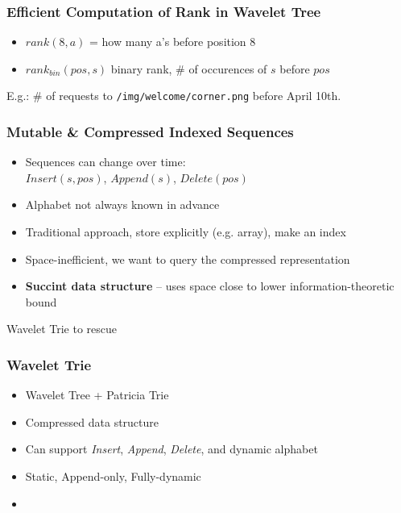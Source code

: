 \documentclass{beamer}
\begin{document}
\begin{frame}
\frametitle{Efficient Computation of Rank in Wavelet Tree}
\begin{itemize}
  \item $rank(8, a)$ = how many a's before position 8
  \item $rank_{bin}(pos, s)$ binary rank, \# of occurences of $s$ before $pos$  
\end{itemize}
\begin{figure}
\end{figure}
{\small E.g.: \# of requests to \texttt{/img/welcome/corner.png} before April 10th.}
\end{frame}


\begin{frame}
\frametitle{Mutable \& Compressed Indexed Sequences}
\begin{itemize}
  \item Sequences can change over time:\\$Insert(s, pos)$, $Append(s)$, $Delete(pos)$
  \item Alphabet not always known in advance 
\end{itemize}
\vspace{10pt}
\begin{itemize}
  \item Traditional approach, store explicitly (e.g. array), make an index
  \item Space-inefficient, we want to query the compressed representation
  \item {\bf Succint data structure} -- uses space close to lower information-theoretic bound
\end{itemize}
\vspace{10pt}
\hspace{10pt}
Wavelet Trie to rescue
\end{frame}


\begin{frame}
\frametitle{Wavelet Trie}
\begin{itemize}
  \item Wavelet Tree + Patricia Trie
  \item Compressed data structure
  \item Can support \emph{Insert}, \emph{Append}, \emph{Delete}, and dynamic alphabet
  \item Static, Append-only, Fully-dynamic
  \item 
\end{itemize}
\end{frame}
\end{document}
